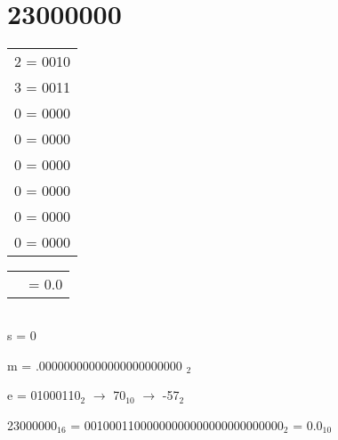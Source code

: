\documentclass{article}
\begin{document}
\section{23000000}\begin{multicols}{2}\begin{center}\begin{tabular}{c}
2 = 0010 \\
3 = 0011 \\
0 = 0000 \\
0 = 0000 \\
0 = 0000 \\
0 = 0000 \\
0 = 0000 \\
0 = 0000 \\
\end{tabular}

\begin{tabular}{r | l}
& = 0.0\\
 \end{tabular}

\begin{tabular}{r | l}
\end{tabular}
\end{center}\end{multicols}

s = 0

m = .00000000000000000000000 $_2$

e = 01000110$_2$ $\rightarrow$ 70$_10$ $\rightarrow$ -57$_2$

23000000$_{16}$ = 00100011000000000000000000000000$_2$ = 0.0$_{10}$\pagebreak

\end{document}
